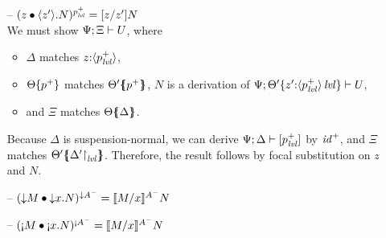 \begin{itemize}
\item[--] $(\subst{z}{\tetap{z'}{N}})^{p^+_{\mlvl}} = [z/z']N$\smallskip\\
  We must show $\foc{\Psi}{\Xi}{U}$, where 
  \begin{itemize}
   \item $\Delta$ matches $z{:}\susp{p^+_\mlvl}$,
   \item $\tackon{\Theta}{p^+}$ matches $\frameoff{\Theta'}{p^+}$,
      $N$ is a derivation of 
      $\foc{\Psi}{\tackon{\Theta'}{z'{:}\islvl{\susp{p^+_\mlvl}}}}{U}$,
   \item and $\Xi$ matches $\frameoff{\Theta}{\Delta}$.
  \end{itemize}
  Because $\Delta$ is suspension-normal, 
  we can derive $\foc{\Psi}{\Delta}{[p^+_\mlvl]}$ by ${\it
    id}^+$, and
  $\Xi$ matches
  $\frameoff{\Theta'}{\restrictto{\Delta'}{\mlvl}}$.
  Therefore, the result follows by focal substitution on $z$ and $N$. 

\smallskip
 
\item[--] $(\subst{\tdownr{M}}{\tdownl{x}{N}})^{{\downarrow}A^-} 
           = \rsubsta{M}{x}{N}{A^-}$ %



\item[--] $(\subst{\tgnabr{M}}{\tgnabl{x}{N}})^{{\scriptgnab}A^-}
           = \rsubsta{M}{x}{N}{A^-}$


\end{itemize}

